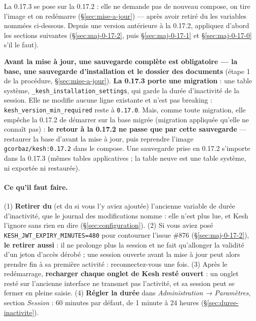 \documentclass[a4paper,11pt,oneside]{article}
\begin{document}
La 0.17.3 se pose sur la 0.17.2 : elle ne demande pas de nouveau compose, on tire l'image et on redémarre (\S\ref{sec:mise-a-jour}) --- après avoir retiré du  les variables nommées ci-dessous. Depuis une version antérieure à la 0.17.2, appliquez d'abord les sections suivantes (\S\ref{sec:maj-0-17-2}, puis \S\ref{sec:maj-0-17-1} et \S\ref{sec:maj-0-17-0} s'il le faut).

\begin{sloppypar}
\textbf{Avant la mise à jour, une sauvegarde complète est obligatoire --- la base, une sauvegarde d'installation  et le dossier des documents} (étape 1 de la procédure, \S\ref{sec:mise-a-jour}). \textbf{La 0.17.3 porte une migration} : une table système, \texttt{\_kesh\_installation\_settings}, qui garde la durée d'inactivité de la session. Elle ne modifie aucune ligne existante et n'est pas breaking : \texttt{kesh\_version\_min\_required} reste à \texttt{0.17.0}. Mais, comme toute migration, elle empêche la 0.17.2 de démarrer sur la base migrée (migration appliquée qu'elle ne connaît pas) : \textbf{le retour à la 0.17.2 ne passe que par cette sauvegarde} --- restaurer la base d'avant la mise à jour, puis reprendre l'image \texttt{gcorbaz/kesh:0.17.2} dans le compose. Une sauvegarde  prise en 0.17.2 s'importe dans la 0.17.3 (mêmes tables applicatives ; la table neuve est une table système, ni exportée ni restaurée).
\end{sloppypar}

\begin{sloppypar}
\paragraph{Ce qu'il faut faire.} (1) \textbf{Retirer du } (et du  si vous l'y aviez ajoutée) l'ancienne variable de durée d'inactivité, que le journal des modifications nomme : elle n'est plus lue, et Kesh l'ignore sans rien en dire (\S\ref{sec:configuration}). (2) Si vous aviez posé \texttt{KESH\_JWT\_EXPIRY\_MINUTES=480} pour contourner l'issue \#876 (\S\ref{sec:maj-0-17-2}), \textbf{le retirer aussi} : il ne prolonge plus la session et ne fait qu'allonger la validité d'un jeton d'accès dérobé ; une session ouverte avant la mise à jour peut alors prendre fin à sa première activité : reconnectez-vous une fois. (3) Après le redémarrage, \textbf{recharger chaque onglet de Kesh resté ouvert} : un onglet resté sur l'ancienne interface ne transmet pas l'activité, et sa session peut se fermer en pleine saisie. (4) \textbf{Régler la durée} dans \emph{Administration → Paramètres}, section \emph{Session} : 60 minutes par défaut, de 1 minute à 24 heures (\S\ref{sec:duree-inactivite}).
\end{sloppypar}
\end{document}
